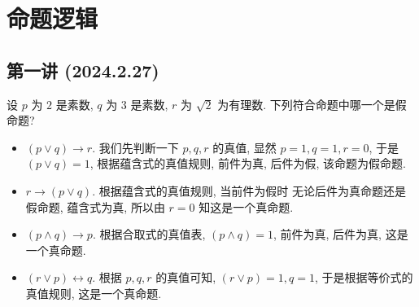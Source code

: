 \documentclass[10pt,UTF8]{ctexbook} %
\begin{document}
\newpage
\thispagestyle{empty}

\pagestyle{plain}
{\tableofcontents}
\newpage
\thispagestyle{empty}
\cleardoublepage %


\makeatletter
\let\ps@plain\ps@empty
\makeatother

\mainmatter

\chapter{命题逻辑}

\section{第一讲 (2024.2.27)}

\begin{exercise}
    设 $p$ 为 $2$ 是素数, $q$ 为 $3$ 是素数, $r$ 为 $\sqrt{2}$ 为有理数.
    下列符合命题中哪一个是假命题?
    \begin{itemize}[itemsep=0pt]
        \item $(p \vee q) \longrightarrow r$. 我们先判断一下 $p,q,r$ 的真值,
        显然 $p=1,q=1,r=0$, 于是 $(p \vee q) = 1$, 根据蕴含式的真值规则,
        前件为真, 后件为假, 该命题为假命题.
        \item $r \longrightarrow (p \vee q)$. 根据蕴含式的真值规则, 当前件为假时
        无论后件为真命题还是假命题, 蕴含式为真, 所以由 $r=0$ 知这是一个真命题.
        \item $(p \wedge q) \longrightarrow p$. 根据合取式的真值表, $(p \wedge q)=1$,
        前件为真, 后件为真, 这是一个真命题.
        \item $(r \vee p) \longleftrightarrow q$. 根据 $p,q,r$ 的真值可知,
        $(r \vee p)=1, q=1$, 于是根据等价式的真值规则, 这是一个真命题.
    \end{itemize} 
\end{exercise}
\end{document}

